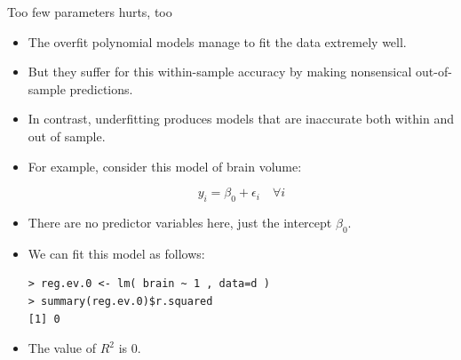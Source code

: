 \documentclass[handout]{beamer}
\begin{document}
\begin{frame}[fragile]{Too few parameters hurts, too}
\scriptsize{

\begin{itemize}
\item The overfit polynomial models manage to fit the data extremely well.

\item But they suffer for this within-sample accuracy by making nonsensical out-of-
sample predictions.

\item In contrast, underfitting produces models that are inaccurate both
within and out of sample.

\item For example, consider this model of brain volume:

\begin{displaymath}
 y_i=\beta_{0}+\epsilon_i \quad \forall i
\end{displaymath}

\item There are no predictor variables here, just the intercept $\beta_{0}$.

\item We can fit this model as follows:

\begin{verbatim}
> reg.ev.0 <- lm( brain ~ 1 , data=d )
> summary(reg.ev.0)$r.squared
[1] 0 
\end{verbatim}

\item The value of $R^2$ is 0.

\end{itemize}


} 
\end{frame}
\end{document}
